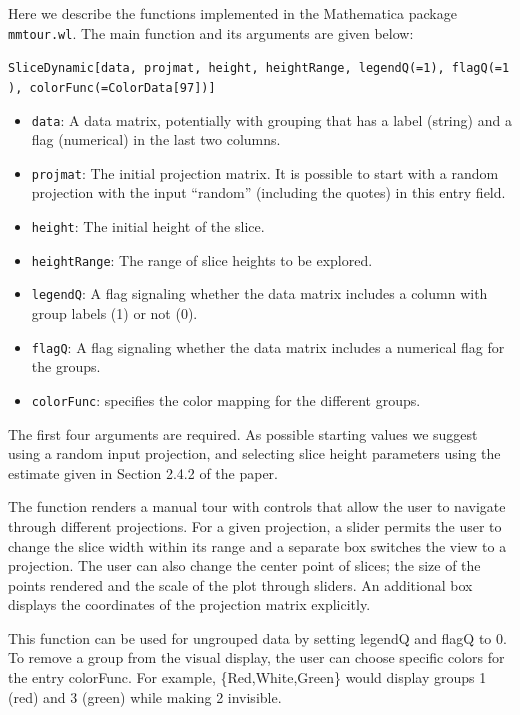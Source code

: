 \documentclass[]{interact}
\theoremstyle{plain}%
\theoremstyle{definition}
\theoremstyle{remark}
\providecommand{\tightlist}{%
  \setlength{\itemsep}{0pt}\setlength{\parskip}{0pt}}
\def\tightlist{}
\begin{document}
Here we describe the functions implemented in the Mathematica package
\texttt{mmtour.wl}. The main function and its arguments are given below:

\texttt{SliceDynamic{[}data,\ projmat,\ height,\ heightRange,\ legendQ(=1),\ flagQ(=1),\ colorFunc(=ColorData{[}97{]}){]}}

\begin{itemize}
\tightlist
\item
  \texttt{data}: A data matrix, potentially with grouping that has a
  label (string) and a flag (numerical) in the last two columns.
\item
  \texttt{projmat}: The initial projection matrix. It is possible to
  start with a random projection with the input ``random'' (including
  the quotes) in this entry field.
\item
  \texttt{height}: The initial height of the slice.
\item
  \texttt{heightRange}: The range of slice heights to be explored.
\item
  \texttt{legendQ}: A flag signaling whether the data matrix includes a
  column with group labels (1) or not (0).
\item
  \texttt{flagQ}: A flag signaling whether the data matrix includes a
  numerical flag for the groups.
\item
  \texttt{colorFunc}: specifies the color mapping for the different
  groups.
\end{itemize}

The first four arguments are required. As possible starting values we
suggest using a random input projection, and selecting slice height
parameters using the estimate given in Section 2.4.2 of the paper.

The function renders a manual tour with controls that allow the user to
navigate through different projections. For a given projection, a slider
permits the user to change the slice width within its range and a
separate box switches the view to a projection. The user can also change
the center point of slices; the size of the points rendered and the
scale of the plot through sliders. An additional box displays the
coordinates of the projection matrix explicitly.

This function can be used for ungrouped data by setting legendQ and
flagQ to 0. To remove a group from the visual display, the user can
choose specific colors for the entry colorFunc. For example,
\{Red,White,Green\} would display groups 1 (red) and 3 (green) while
making 2 invisible.
\end{document}
